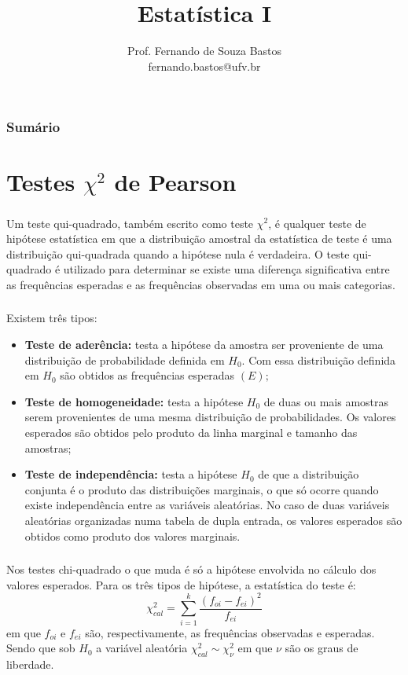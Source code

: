 \documentclass[14pt,aspectratio=1610]{beamer}
\title{Estatística I}
\author{Prof. Fernando de Souza Bastos \texorpdfstring{\\ fernando.bastos@ufv.br}{}}
\institute{Departamento de Estatística \texorpdfstring{\\ Universidade Federal de Viçosa}{}\texorpdfstring{\\ Campus UFV - Viçosa}{}}
\date{}
\newcommand{\Ho}{\ensuremath{H_{0}}}
\begin{document}
%

\frame{\titlepage}

\begin{frame}{}
\frametitle{\bf Sumário}
\tableofcontents
\end{frame}

\section{Testes $\chi^{2}$ de Pearson}
\begin{frame}{}
\frametitle{}
\begin{block}{}
\justifying
Um teste qui-quadrado, também escrito como teste $\chi^{2}$, é qualquer teste de hipótese estatística em que a distribuição amostral da estatística de teste é uma distribuição qui-quadrada quando a hipótese nula é verdadeira. O teste qui-quadrado é utilizado para determinar se existe uma diferença significativa entre as frequências esperadas e as frequências observadas em uma ou mais categorias.
\end{block}
\end{frame}

\begin{frame}{}
\frametitle{}
\small
\begin{block}{}
\justifying
Existem três tipos:
\begin{itemize}
\item {\bf Teste de aderência:} \justifying testa a hipótese da amostra ser proveniente de uma distribuição de probabilidade definida em $\Ho.$ Com essa distribuição definida em $\Ho$ são obtidos as frequências esperadas $(E);$\pause
\item {\bf Teste de homogeneidade:} testa a hipótese $\Ho$ de duas ou mais amostras serem provenientes de uma mesma distribuição de probabilidades. Os valores esperados são obtidos pelo produto da linha marginal e tamanho das amostras;\pause
\item {\bf Teste de independência:} testa a hipótese $\Ho$ de que a distribuição conjunta é o produto das distribuições marginais, o que só ocorre quando existe independência entre as variáveis aleatórias. No caso de duas variáveis aleatórias organizadas numa tabela de dupla entrada, os valores esperados são obtidos como produto dos valores marginais.
\end{itemize}
\end{block}
\end{frame}

\begin{frame}{}
\frametitle{}
\begin{block}{}
\justifying
Nos testes chi-quadrado o que muda é só a hipótese envolvida no cálculo dos valores esperados. Para os três tipos de hipótese, a estatística do teste é:
$$\chi^{2}_{cal}={\displaystyle \sum_{i=1}^{k}\dfrac{(f_{oi}-f_{ei})^{2}}{f_{ei}}}$$
em que $f_{oi}$ e $f_{ei}$ são, respectivamente, as frequências observadas e esperadas. Sendo que sob $\Ho$ a variável aleatória $\chi^{2}_{cal}\sim \chi^{2}_{\nu}$ em que $\nu$ são os graus de liberdade.
\nocite{Apostila}
\end{block}
\end{frame}
\end{document}
